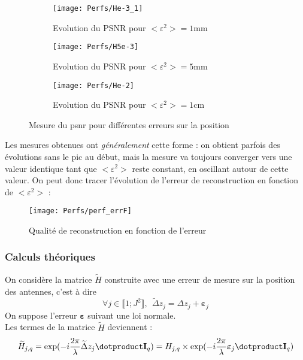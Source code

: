 \documentclass[titlepage]{article}
\begin{document}
	\begin{figure}[H]
		\centering
		\begin{subfigure}{.5\textwidth}
			\centering
			\texttt{[image: Perfs/He-3\_1]}
			\caption{Evolution du PSNR pour $<\varepsilon^2>=1$mm}
			\label{fig:he-3}
		\end{subfigure}%
		\begin{subfigure}{.5\textwidth}
			\centering
			\texttt{[image: Perfs/H5e-3]}
			\caption{Evolution du PSNR pour $<\varepsilon^2>=5$mm}
			\label{fig:h5e-3}
		\end{subfigure}
		\begin{subfigure}{.5\textwidth}
			\centering
			\texttt{[image: Perfs/He-2]}
			\caption{Evolution du PSNR pour $<\varepsilon^2>=1$cm}
			\label{fig:he-2}
		\end{subfigure}
		\caption{Mesure du psnr pour différentes erreurs sur la position}
	\end{figure}

	Les mesures obtenues ont \emph{généralement} cette forme : on obtient parfois des évolutions sans le pic au début, mais la mesure va toujours converger vers une valeur identique tant que $<\varepsilon^2>$ reste constant, en oscillant autour de cette valeur. On peut donc tracer l'évolution de l'erreur de reconstruction en fonction de $<\varepsilon^2>$ :
	
	\begin{figure}[H]
		\centering
		\texttt{[image: Perfs/perf\_errF]}
		\caption{Qualité de reconstruction en fonction de l'erreur}
	\end{figure}

	\subsubsection{Calculs théoriques}
	
	On considère la matrice $\widetilde{H}$ construite avec une erreur de mesure sur la position des antennes, c'est à dire 
	$$
		\forall j \in \llbracket1;J^2\rrbracket,\:\: \widetilde{\Delta} z_j = \Delta z_j + \boldsymbol{\varepsilon}_j
	$$
	On suppose l'erreur $\boldsymbol{\varepsilon}$ suivant une loi normale.\\
	Les termes de la matrice $\widetilde{H}$ deviennent :
	$$
		\widetilde{H}_{j,q} = \exp(-i\frac{2\pi}{\lambda}\widetilde{\Delta}z_j\dotproduct\mathbf{I}_q) = H_{j,q}\times\exp(-i\frac{2\pi}{\lambda}\boldsymbol{\varepsilon}_j\dotproduct\mathbf{I}_q)
	$$
	
\end{document}
